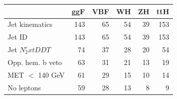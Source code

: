 \begin{tabular}{lrrrrr}
\toprule
 & ggF & VBF & WH & ZH & ttH \\
\midrule
Jet kinematics & 143 & 65 & 54 & 39 & 153 \\
Jet ID & 143 & 65 & 54 & 39 & 153 \\
Jet $N_2^	ext{DDT}$ & 74 & 37 & 28 & 20 & 54 \\
Opp. hem. b veto & 63 & 31 & 21 & 13 & 19 \\
MET $<$ 140 GeV & 61 & 29 & 15 & 10 & 14 \\
No leptons & 59 & 28 & 13 & 8 & 9 \\
\bottomrule
\end{tabular}
